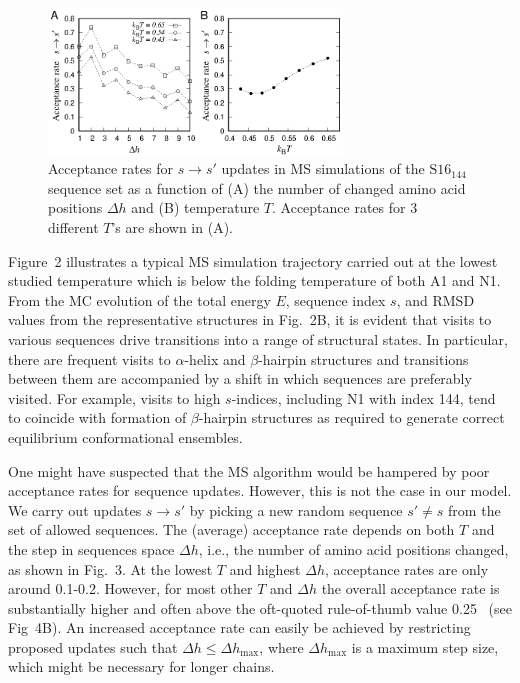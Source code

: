 \documentclass[
aip,
rsi,%
amsmath,amssymb,
reprint,%
]{revtex4-1}
\newcommand	 {\sbar}	{{s}}
\newcommand {\SR}		{${\mathrm{S16}_{144}}$}
\begin{document}
\begin{figure}
\includegraphics[width=7.8cm]{Fig3}
\caption{Acceptance rates for $\sbar\rightarrow\sbar'$ updates in MS simulations of the {\SR} sequence set as a function of (A) the number of changed amino acid positions $\Delta h$ and (B) temperature $T$. Acceptance rates for 3 different $T$'s are shown in (A).}
\end{figure}

Figure~2 illustrates a typical MS simulation trajectory carried out at the lowest studied temperature which is below the folding temperature of both A1 and N1.~\cite{Holzgrafe2014,Holzgrafe2015} From the MC evolution of the total energy $E$, sequence index $\sbar$, and RMSD values from the representative structures in Fig.~2B, it is evident that visits to various sequences drive transitions into a range of structural states. In particular, there are frequent visits to $\alpha$-helix and $\beta$-hairpin structures and transitions between them are accompanied by a shift in which sequences are preferably visited. For example, visits to high $\sbar$-indices, including N1 with index 144, tend to coincide with formation of $\beta$-hairpin structures as required to generate correct equilibrium conformational ensembles. 

One might have suspected that the MS algorithm would be hampered by poor acceptance rates for sequence updates. However, this is not the case in our model. We carry out updates $\sbar\rightarrow\sbar'$ by picking a new random sequence $\sbar'\ne\sbar$ from the set of allowed sequences. The (average) acceptance rate  depends on both $T$ and the step in sequences space $\Delta h$, i.e., the number of amino acid positions changed, as shown in Fig.~3. At the lowest $T$ and highest $\Delta h$, acceptance rates are only around 0.1-0.2. However, for most other $T$ and $\Delta h$ the overall acceptance rate is substantially higher and often above the oft-quoted rule-of-thumb value 0.25~\cite{Gilks1996} (see Fig~4B). An increased acceptance rate can easily be achieved by restricting proposed updates such that $\Delta h\le\Delta h_\mathrm{max}$, where $\Delta h_\mathrm{max}$ is a maximum step size, which might be necessary for longer chains. 
\end{document}
